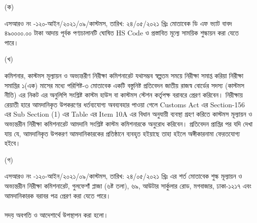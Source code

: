 \documentclass[12pt]{article}
\newcommand{\srooot}{এসআরও নং -১২০-আইন/২০২১/০৯/কাস্টমস}
\newcommand{\sroootd}{তারিখ: ২৪/০৫/২০২১ খ্রিঃ}
\begin{document}
\begin{minipage}[t]{0.05\linewidth}
\hspace{1em}
\end{minipage}
\begin{minipage}[t]{0.05\linewidth}
(ক)
\end{minipage}
\begin{minipage}[t]{0.90\linewidth}
{\srooot}, {\sroootd} মোতাবেক
ডি এফ ভ্যাট বাবদ ৪৯০০০০.০০ টাকা
আদায় পূর্বক পণ্যচালানটি ঘোষিত HS Code
ও প্রস্তাবিত মূল্যে সাময়িক শুল্কায়ন করা যেতে
পারে।
\end{minipage}
\begin{minipage}[t]{0.05\linewidth}
\hspace{1em}
\end{minipage}
\begin{minipage}[t]{0.05\linewidth}
(খ)
\end{minipage}
\begin{minipage}[t]{0.90\linewidth}
কমিশনার, কাস্টমস মূল্যায়ন ও অভ্যন্তরীণ
নিরীক্ষা কমিশনারেট যথাসম্ভব স্বল্পতম সময়ে
নিরীক্ষা সমাপ্ত করিয়া নিরীক্ষা সমাপ্তির
১(এক) মাসের মধ্যে পরিশিষ্ট-৩ মোতাবেক একটি
বস্তুনিষ্ট প্রতিবেদন জাতীয় রাজস্ব বোর্ডের
সদস্য (কাস্টমস নীতি) এর নিকট এর অনুলিপি সংশ্লিষ্ট
কাস্টম হাউস বা কাস্টমস স্টেশন কর্তৃপক্ষ
বরাবরে প্রেরণ করিবেন।
নিরীক্ষায় রেয়াতী হারে আমদানিকৃত উপকরণের
ধর্তব্যযোগ্য অবব্যবহার পাওয়া গেলে
Customs Act এর Section-156
এর Sub Section (1) এর Table এর Item 10A
এর বিধান অনুযায়ী ব্যবস্থা গ্রহণ করিতে কাস্টমস
মূল্যায়ন ও অভ্যন্তরীন নিরীক্ষা কমিশনারেট আমদানি
সংশ্লিষ্ট কাস্টম কমিশনারকে অনুরোধ করিবেন।
প্রতিবেদন প্রাপ্তির পর যদি দেখা যায় যে, আমদানিকৃত
উপকরণ আমদানিকারকের প্রতিষ্ঠানে ব্যবহৃত হইয়াছে তাহা
হইলে অঙ্গীকারনামা ফেরতযোগ্য হইবে।
\end{minipage}
\begin{minipage}[t]{0.05\linewidth}
\hspace{1em}
\end{minipage}
\begin{minipage}[t]{0.05\linewidth}
(গ)
\end{minipage}
\begin{minipage}[t]{0.90\linewidth}
{\srooot}, {\sroootd} এর শর্ত মোতাবেক
শুল্ক মূল্যায়ন ও অভ্যন্তরীন নিরীক্ষা কমিশনারেট,
গুলফেশাঁ প্লাজা (৬ষ্ট তলা), ৬৯, আউটার
সার্কুলার রোড, মগবাজার, ঢাকা-১২১৭ এবং
আমদানিকারক বরাবর পত্র প্রেরণ করা যেতে পারে।
\\
\\
সদয় অবগতি ও আদেশার্থে উপস্থাপন করা
হলো।
\end{minipage}
\end{document}
